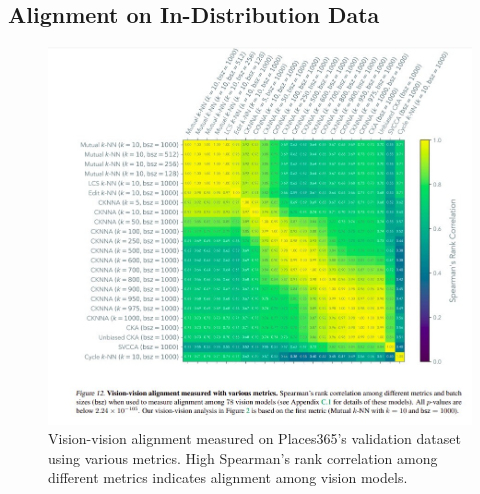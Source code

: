 \documentclass[10pt,a4paper]{article}
\begin{document}
\subsection{Alignment on In-Distribution Data}
\begin{figure}[H]
    \centering
    \includegraphics[width=\textwidth]{prh_correlation.jpg}
    \caption{Vision-vision alignment measured on Places365’s validation dataset using various metrics. High Spearman's rank correlation among different metrics indicates alignment among vision models.}
    \label{fig:prh_correlation}
\end{figure}
\end{document}
